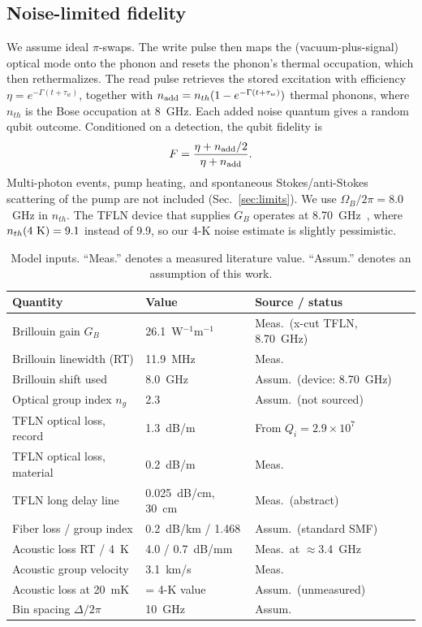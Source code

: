 \documentclass[reprint,amsmath,amssymb,aps,prapplied,superscriptaddress,floatfix]{revtex4-2}
\begin{document}
\subsection{Noise-limited fidelity}
We assume ideal $\pi$-swaps. The write pulse then maps the (vacuum-plus-signal) optical mode onto the phonon and resets the phonon's thermal occupation, which then rethermalizes. The read pulse retrieves the stored excitation with efficiency $\eta=e^{-\Gamma(t+\tau_w)}$, together with $n_{\rm add}=n_{th}(1-e^{-\Gamma(t+\tau_w)})$ thermal phonons, where $n_{th}$ is the Bose occupation at 8~GHz. Each added noise quantum gives a random qubit outcome. Conditioned on a detection, the qubit fidelity is
\begin{equation}
F=\frac{\eta+n_{\rm add}/2}{\eta+n_{\rm add}}.\label{eq:F}
\end{equation}
Multi-photon events, pump heating, and spontaneous Stokes/anti-Stokes scattering of the pump are not included (Sec.~\ref{sec:limits}). We use $\Omega_B/2\pi=8.0$~GHz in $n_{th}$. The TFLN device that supplies $G_B$ operates at 8.70~GHz~\cite{Ye2023SAW}, where $n_{th}(4~{\rm K})=9.1$ instead of 9.9, so our 4-K noise estimate is slightly pessimistic.

\begin{table}[t]
\footnotesize
\caption{Model inputs. ``Meas.'' denotes a measured literature value. ``Assum.'' denotes an assumption of this work.}
\label{tab:params}
\begin{ruledtabular}
\begin{tabular}{p{2.9cm}p{2.2cm}p{3.0cm}}
Quantity & Value & Source / status\\ \hline
\raggedright Brillouin gain $G_B$&\raggedright 26.1~W$^{-1}$m$^{-1}$&\raggedright Meas.\ (x-cut TFLN, 8.70~GHz)~\cite{Ye2023SAW}\tabularnewline
\raggedright Brillouin linewidth (RT)&\raggedright 11.9~MHz&\raggedright Meas.~\cite{Ye2023SAW}\tabularnewline
\raggedright Brillouin shift used&\raggedright 8.0~GHz&\raggedright Assum.\ (device: 8.70~GHz)\tabularnewline
\raggedright Optical group index $n_g$&\raggedright 2.3&\raggedright Assum.\ (not sourced)\tabularnewline
\raggedright TFLN optical loss, record&\raggedright 1.3~dB/m&\raggedright From $Q_i=2.9\times10^7$~\cite{ZhuX2024PRJ}\tabularnewline
\raggedright TFLN optical loss, material&\raggedright 0.2~dB/m&\raggedright Meas.~\cite{ShamsAnsari2022}\tabularnewline
\raggedright TFLN long delay line&\raggedright 0.025~dB/cm, 30~cm&\raggedright Meas.\ (abstract)~\cite{Song2023ODL}\tabularnewline
\raggedright Fiber loss / group index&\raggedright 0.2~dB/km / 1.468&\raggedright Assum.\ (standard SMF)\tabularnewline
\raggedright Acoustic loss RT / 4~K&\raggedright 4.0 / 0.7~dB/mm&\raggedright Meas.\ at $\approx$3.4~GHz~\cite{Mayor2021}\tabularnewline
\raggedright Acoustic group velocity&\raggedright 3.1~km/s&\raggedright Meas.~\cite{Mayor2021}\tabularnewline
\raggedright Acoustic loss at 20~mK&\raggedright = 4-K value&\raggedright Assum.\ (unmeasured)\tabularnewline
\raggedright Bin spacing $\Delta/2\pi$&\raggedright 10~GHz&\raggedright Assum.\tabularnewline
\end{tabular}
\end{ruledtabular}
\end{table}
\end{document}
